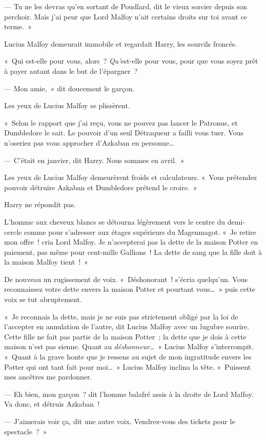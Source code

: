 --- Tu ne les devras qu'en sortant de Poudlard, dit le vieux sorcier depuis son perchoir.
Mais j'ai peur que Lord Malfoy n'ait certains droits sur toi avant ce terme.~»

Lucius Malfoy demeurait immobile et regardait Harry, les sourcils froncés.

«~Qui est-elle pour vous, alors~?
\emph{Qu'}est-elle pour vous, pour que vous soyez prêt à payer autant dans le but de l'épargner~?

--- Mon amie,~» dit doucement le garçon.

Les yeux de Lucius Malfoy se plissèrent.

«~Selon le rapport que j'ai reçu, vous ne pouvez pas lancer le Patronus, et Dumbledore le sait.
Le pouvoir d'un seul Détraqueur a failli vous tuer.
Vous n'oseriez pas vous approcher d'Azkaban en personne…

--- C'était en janvier, dit Harry.
Nous sommes en avril.~»

Les yeux de Lucius Malfoy demeurèrent froids et calculateurs.
«~Vous prétendez pouvoir détruire Azkaban et Dumbledore prétend le croire.~»

Harry ne répondit pas.

L'homme aux cheveux blancs se détourna légèrement vers le centre du demi-cercle comme pour s'adresser aux étages supérieurs du Magenmagot.
«~Je retire mon offre~! cria Lord Malfoy.
Je n'accepterai pas la dette de la maison Potter en paiement, pas même pour cent-mille Gallions~!
La dette de sang que la fille doit à la maison Malfoy tient~!~»

De nouveau un rugissement de voix.
«~Déshonorant~! s'écria quelqu'un.
Vous reconnaissez votre dette envers la maison Potter et pourtant vous…~»
puis cette voix se tut abruptement.

«~Je reconnais la dette, mais je ne suis pas strictement obligé par la loi de l'accepter en annulation de l'autre, dit Lucius Malfoy avec un lugubre sourire.
Cette fille ne fait pas partie de la maison Potter~; la dette que je dois à cette maison n'est pas sienne.
Quant au \emph{déshonneur}…~»
Lucius Malfoy s'interrompit.
«~Quant à la grave honte que je ressens au sujet de mon ingratitude envers les Potter qui ont tant fait pour moi…~»
Lucius Malfoy inclina la tête.
«~Puissent mes ancêtres me pardonner.

--- Eh bien, mon garçon~? dit l'homme balafré assis à la droite de Lord Malfoy.
Va donc, et détruis Azkaban~!

--- J'aimerais voir ça, dit une autre voix.
Vendrez-vous des tickets pour le spectacle~?~»


